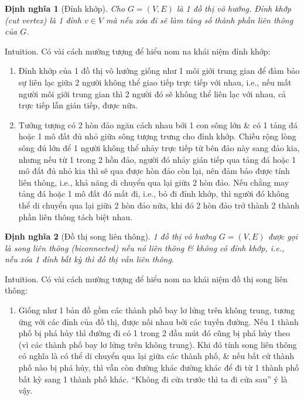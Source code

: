 \documentclass{article}
\newtheorem{dinhnghia}{Định nghĩa}
\begin{document}
\begin{dinhnghia}[Đỉnh khớp]
    Cho $G = (V,E)$ là 1 đồ thị vô hướng. {\rm Đỉnh khớp (cut vertex)} là 1 đỉnh $v\in V$ mà nếu xóa đi sẽ làm tăng số thành phần liên thông của $G$.
\end{dinhnghia}
{\sf Intuition.} Có vài cách mường tượng để hiểu nom na khái niệm đỉnh khớp:
\begin{enumerate}
    \item Đỉnh khớp của 1 đồ thị vô hướng giống như 1 môi giới trung gian để đảm bảo sự liên lạc giữa 2 người không thể giao tiếp trực tiếp với nhau, i.e., nếu mất người môi giới trung gian thì 2 người đó sẽ không thể liên lạc với nhau, cả trực tiếp lẫn gián tiếp, được nữa.

    \item Tưởng tượng có 2 hòn đảo ngăn cách nhau bởi 1 con sông lớn \& có 1 tảng đá hoặc 1 mô đất đủ nhỏ giữa sông tượng trưng cho đỉnh khớp. Chiều rộng lòng sông đủ lớn để 1 người không thể nhảy trực tiếp từ bên đảo này sang đảo kia, nhưng nếu từ 1 trong 2 hồn đảo, người đó nhảy gián tiếp qua tảng đá hoặc 1 mô đất đủ nhỏ kia thì sẽ qua được hòn đảo còn lại, nên đảm bảo được tính liên thông, i.e., khả năng di chuyển qua lại giữa 2 hòn đảo. Nếu chẳng may tảng đá hoặc 1 mô đất đó mất đi, i.e., bỏ đi đỉnh khớp, thì người đó không thể di chuyển qua lại giữa 2 hòn đảo nữa, khi đó 2 hòn đảo trở thành 2 thành phần liên thông tách biệt nhau.
\end{enumerate}

\begin{dinhnghia}[Đồ thị song liên thông]
    1 đồ thị vô hướng $G = (V,E)$ được gọi là {\rm song liên thông (biconnected)} nếu nó liên thông \& không có đỉnh khớp, i.e., nếu xóa 1 đỉnh bất kỳ thì đồ thị vẫn liên thông.
\end{dinhnghia}
{\sf Intuition.} Có vài cách mường tượng để hiểu nom na khái niệm đồ thị song liên thông:
\begin{enumerate}
    \item Giống như 1 bản đồ gồm các thành phố bay lơ lửng trên không trung, tương ứng với các đỉnh của đồ thị, được nối nhau bởi các tuyến đường. Nếu 1 thành phố bị phá hủy thì đường đi có 1 trong 2 đầu mút đó cũng bị phá hủy theo (vì các thành phố bay lơ lửng trên không trung). Khi đó tính song liên thông có nghĩa là có thể di chuyển qua lại giữa các thành phố, \& nếu bất cứ thành phố nào bị phá hủy, thì vẫn còn đường khác đường khác để đi từ 1 thành phố bất kỳ sang 1 thành phố khác. ``Không đi cửa trước thì ta đi cửa sau'' ý là vậy.
\end{enumerate}
\end{document}
